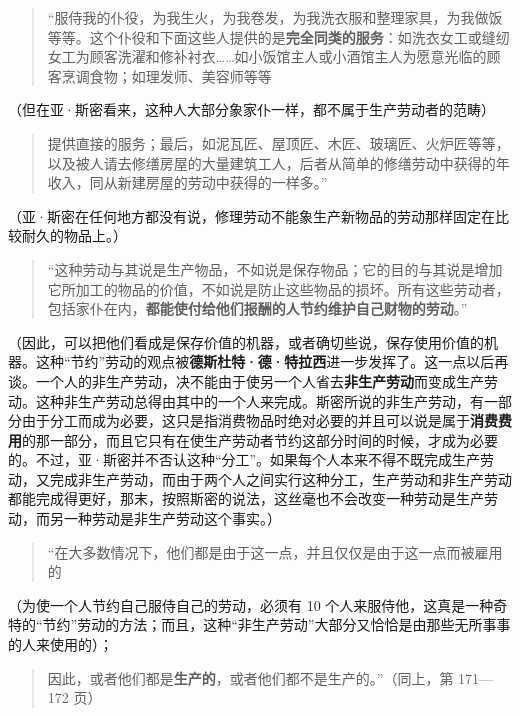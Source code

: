 \begin{quote}“服侍我的仆役，为我生火，为我卷发，为我洗衣服和整理家具，为我做饭等等。这个仆役和下面这些人提供的是\textbf{完全同类的服务}：如洗衣女工或缝纫女工为顾客洗濯和修补衬衣……如小饭馆主人或小酒馆主人为愿意光临的顾客烹调食物；如理发师、美容师等等\end{quote}

（但在亚·斯密看来，这种人大部分象家仆一样，都不属于生产劳动者的范畴）

\begin{quote}提供直接的服务；最后，如泥瓦匠、屋顶匠、木匠、玻璃匠、火炉匠等等，以及被人请去修缮房屋的大量建筑工人，后者从简单的修缮劳动中获得的年收入，同从新建房屋的劳动中获得的一样多。”\end{quote}

（亚·斯密在任何地方都没有说，修理劳动不能象生产新物品的劳动那样固定在比较耐久的物品上。）

\begin{quote}“这种劳动与其说是生产物品，不如说是保存物品；它的目的与其说是增加它所加工的物品的价值，不如说是防止这些物品的损坏。所有这些劳动者，包括家仆在内，\textbf{都能使付给他们报酬的人节约维护自己财物的劳动}。”\end{quote}

（因此，可以把他们看成是保存价值的机器，或者确切些说，保存使用价值的机器。这种“节约”劳动的观点被\textbf{德斯杜特·德·特拉西}进一步发挥了。这一点以后再谈。一个人的非生产劳动，决不能由于使另一个人省去\textbf{非生产劳动}而变成生产劳动。这种非生产劳动总得由其中的一个人来完成。斯密所说的非生产劳动，有一部分由于分工而成为必要，这只是指消费物品时绝对必要的并且可以说是属于\textbf{消费费用}的那一部分，而且它只有在使生产劳动者节约这部分时间的时候，才成为必要的。不过，亚·斯密并不否认这种“分工”。如果每个人本来不得不既完成生产劳动，又完成非生产劳动，而由于两个人之间实行这种分工，生产劳动和非生产劳动都能完成得更好，那末，按照斯密的说法，这丝毫也不会改变一种劳动是生产劳动，而另一种劳动是非生产劳动这个事实。）

\begin{quote}“在大多数情况下，他们都是由于这一点，并且仅仅是由于这一点而被雇用的\end{quote}

（为使一个人节约自己服侍自己的劳动，必须有 10 个人来服侍他，这真是一种奇特的“节约”劳动的方法；而且，这种“非生产劳动”大部分又恰恰是由那些无所事事的人来使用的）；

\begin{quote}因此，或者他们都是\textbf{生产的}，或者他们都不是生产的。”（同上，第 171—172 页）\end{quote}


